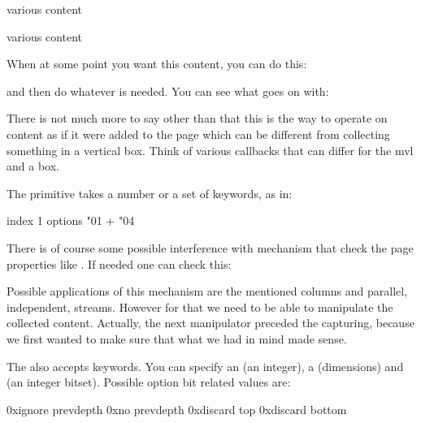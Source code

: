 \starttyping
{}
various content
\endmvl

various content
\endmvl
\stoptyping

When at some point you want this content, you can do this:

\starttyping
\setbox\scratchboxone{}
\setbox\scratchboxtwo{}
\stoptyping

and then do whatever is needed. You can see what goes on with:

\starttyping
{}
\stoptyping

There is not much more to say other than that this is the way to operate on
content as if it were added to the page which can be different from collecting
something in a vertical box. Think of various callbacks that can differ for the
mvl and a box.

The \type {\beginmvl} primitive takes a number or a set of keywords, as in:

\starttyping
\beginmvl
    index   1
    options \numexpr "01 + "04\relax
\relax
\stoptyping

There is of course some possible interference with mechanism that check the page
properties like \type {\pagegoal}. If needed one can check this:

\starttyping
\ifcase\mvlcurrentlyactive
\or
\else
\fi
\stoptyping

Possible applications of this mechanism are the mentioned columns and parallel,
independent, streams. However for that we need to be able to manipulate the
collected content. Actually, the next manipulator preceded the capturing, because
we first wanted to make sure that what we had in mind made sense.

The  also accepts keywords. You can specify an  (an
integer), a  (dimensions) and  (an integer
bitset). Possible option bit related values are:

\starttabulate[|Tr|||]
\NC 0x\tohexadecimal\ignoreprevdepthmvloptioncode \NC ignore prevdepth \NC \type {\ignoreprevdepthmvloptioncode} \NC \NR
\NC 0x\tohexadecimal\noprevdepthmvloptioncode     \NC no prevdepth     \NC \type {\noprevdepthmvloptioncode    } \NC \NR
\NC 0x\tohexadecimal\discardtopmvloptioncode      \NC discard top      \NC \type {\discardtopmvloptioncode     } \NC \NR
\NC 0x\tohexadecimal\discardbottommvloptioncode   \NC discard bottom   \NC \type {\discardbottommvloptioncode  } \NC \NR
\stoptabulate

